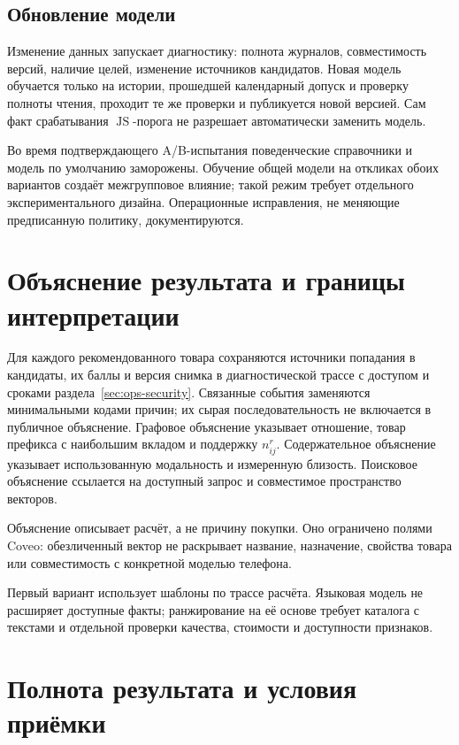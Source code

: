 \documentclass[12pt,a4paper]{article}
\theoremstyle{plainru}
\begin{document}
\subsection{Обновление модели}

Изменение данных запускает диагностику: полнота журналов,
совместимость версий, наличие целей, изменение источников кандидатов.
Новая модель обучается только на истории, прошедшей календарный допуск
и проверку полноты чтения, проходит те же
проверки и публикуется новой версией. Сам факт срабатывания
\(\operatorname{JS}\)-порога не разрешает автоматически заменить модель.

Во время подтверждающего A/B-испытания поведенческие справочники
и модель по умолчанию заморожены. Обучение общей модели на откликах
обоих вариантов создаёт межгрупповое влияние; такой режим требует
отдельного экспериментального дизайна. Операционные исправления,
не меняющие предписанную политику, документируются.

\section{Объяснение результата и границы интерпретации}\label{sec:explanation}

Для каждого рекомендованного товара сохраняются источники попадания
в кандидаты, их баллы и версия снимка в диагностической трассе
с доступом и сроками раздела~\ref{sec:ops-security}.
Связанные события заменяются минимальными кодами причин;
их сырая последовательность не включается в публичное объяснение.
Графовое объяснение указывает отношение, товар префикса с наибольшим
вкладом и поддержку $n^r_{ij}$. Содержательное объяснение указывает использованную
модальность и измеренную близость. Поисковое объяснение ссылается
на доступный запрос и совместимое пространство векторов.

Объяснение описывает расчёт, а не причину покупки. Оно ограничено полями
Coveo: обезличенный вектор не раскрывает название, назначение,
свойства товара или совместимость с конкретной моделью телефона.

Первый вариант использует шаблоны по трассе расчёта.
Языковая модель не расширяет доступные факты; ранжирование на её основе
требует каталога с текстами и отдельной проверки качества, стоимости
и доступности признаков.

\section{Полнота результата и условия приёмки}\label{sec:acceptance}
\end{document}
